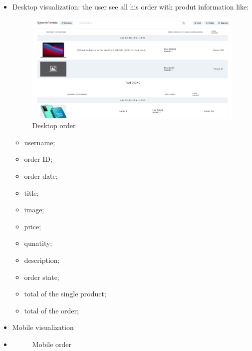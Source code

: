 \begin{itemize}
    \item Desktop visualization:
          the user see all his order with produt information like:
          \begin{figure}[!ht]
              \caption{Desktop order}
              \vspace{10px}
              \includegraphics[scale=0.25]{../../../../Images/userManual/orderDesktop.png}
              \centering
          \end{figure}
          \begin{itemize}
              \item username;
              \item order ID;
              \item order date;
              \item title;
              \item image;
              \item price;
              \item qunatity;
              \item description;
              \item order state;
              \item total of the single product;
              \item total of the order;
          \end{itemize}
    \item Mobile visualization
    \item \begin{figure}[!ht]
              \caption{Mobile order}
              \vspace{10px}

\end{figure}
\end{itemize}
